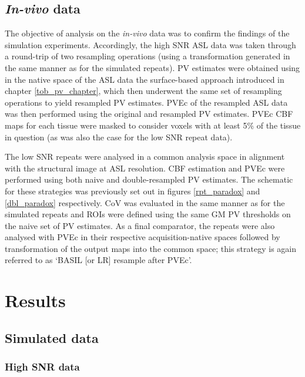 \subsection{\textit{In-vivo} data}

The objective of analysis on the \textit{in-vivo} data was to confirm the findings of the simulation experiments. Accordingly, the high SNR ASL data was taken through a round-trip of two resampling operations (using a transformation generated in the same manner as for the simulated repeats). PV estimates were obtained using in the native space of the ASL data the surface-based approach introduced in chapter \ref{tob_pv_chapter}, which then underwent the same set of resampling operations to yield resampled PV estimates. PVEc of the resampled ASL data was then performed using the original and resampled PV estimates. PVEc CBF maps for each tissue were masked to consider voxels with at least 5\% of the tissue in question (as was also the case for the low SNR repeat data). 

The low SNR repeats were analysed in a common analysis space in alignment with the structural image at ASL resolution. CBF estimation and PVEc were performed using both naive and double-resampled PV estimates. The schematic for these strategies was previously set out in figures \ref{rpt_paradox} and \ref{dbl_paradox} respectively. CoV was evaluated in the same manner as for the simulated repeats and ROIs were defined using the same GM PV thresholds on the naive set of PV estimates. As a final comparator, the repeats were also analysed with PVEc in their respective acquisition-native spaces followed by transformation of the output maps into the common space; this strategy is again referred to as `BASIL [or LR] resample after PVEc'. 

\section{Results}

\subsection{Simulated data}

\subsubsection{High SNR data}

